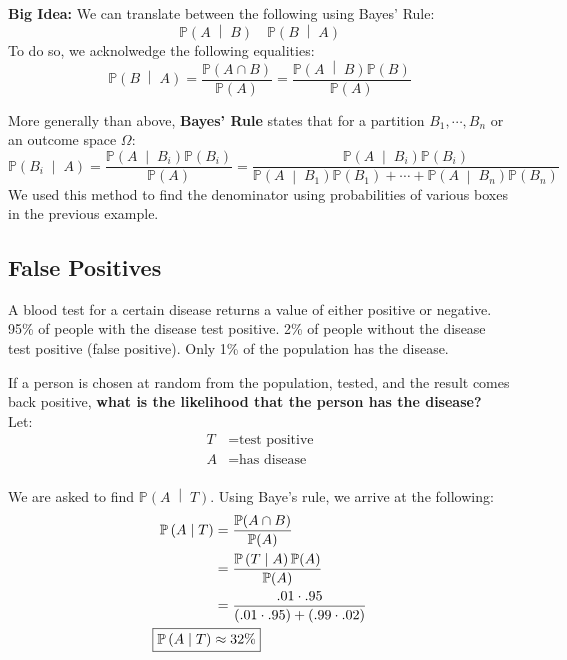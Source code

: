 \documentclass[titlepage, 12pt, leqno]{article}
\begin{document}
\pagebreak
\textbf{Big Idea:} We can translate between the following using Bayes' Rule:
\[
    \mathbb{P}\left(A \;\middle|\; B\right) \quad \mathbb{P}\left(B \;\middle|\; A\right) 
\]
To do so, we acknolwedge the following equalities:
\[
\boxed{\mathbb{P}\left(B \;\middle|\; A\right) = \frac{\mathbb{P}(A \cap B)}{\mathbb{P}(A)} = \frac{ \mathbb{P}\left(A \;\middle|\; B\right) \mathbb{P}(B)}{\mathbb{P}(A)}}
\]

\begin{definition}
    More generally than above, \textbf{Bayes' Rule} states that for a partition $B_1, \cdots , B_n$ or an outcome space $\Omega $:
    \[
    \mathbb{P}\left(B_i \;\middle|\; A\right) = \frac{ \mathbb{P}\left(A \;\middle|\; B_i\right) \mathbb{P}(B_i)}{\mathbb{P}(A)} = \frac{ \mathbb{P}\left(A \;\middle|\; B_i\right) \mathbb{P}(B_i)}{ \mathbb{P}\left(A \;\middle|\; B_1\right) \mathbb{P}(B_1) + \cdots + \mathbb{P}\left(A \;\middle|\; B_n\right) \mathbb{P}(B_n)} 
    \]
    We used this method to find the denominator using probabilities of various boxes in the previous example.
\end{definition}

\subsection{False Positives}
\begin{ex}
    A blood test for a certain disease returns a value of either positive or negative. 95\% of people with the disease test positive. 2\% of people without the disease test positive (false positive). Only 1\% of the population has the disease.

    If a person is chosen at random from the population, tested, and the result comes back positive, \textbf{what is the likelihood that the person has the disease?} \\[.1in]
    Let:
   \begin{align*}
       T &= \text{test positive}\\
       A &= \text{has disease}\\
   \end{align*}

   We are asked to find $ \mathbb{P}\left(A \;\middle|\; T\right) $. Using Baye's rule, we arrive at the following:
  \begin{align*}
      \mathbb{P}\left(A \;\middle|\; T\right) &= \frac{\mathbb{P}(A \cap B)}{\mathbb{P}(A)} \\
                                              &= \frac{ \mathbb{P}\left(T \;\middle|\; A\right) \mathbb{P}(A)}{\mathbb{P}(A)} \\
                                              &= \frac{.01 \cdot .95}{(.01 \cdot .95)+(.99 \cdot .02)} \\
  \Aboxed{\mathbb{P}\left(A \;\middle|\; T\right) &\approx 32\%}
  \end{align*}
  
\end{ex}
\pagebreak
\end{document}
